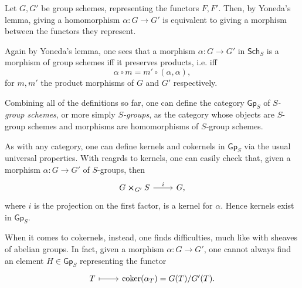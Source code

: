 \documentclass[../Main]{subfiles}
\begin{document}
\begin{rem}
	Let $G, G'$ be group schemes, representing the functors $F,F'$.
	Then, by Yoneda's lemma, giving a homomorphism $\alpha\colon G \to G'$
	is equivalent to giving a morphism between the functors they represent.

	Again by Yoneda's lemma, one sees that a morphism $\alpha\colon G \to G'$
	in $\mathsf{Sch}_{ S }$ is a morphism of group schemes iff
	it preserves products, i.e. iff
	\begin{equation}
		\alpha \circ m = m' \circ (\alpha, \alpha)
	,\end{equation} 
	for $m, m'$ the product morphisms of $G$ and $G'$ respectively.
\end{rem}

\begin{defn}
	Combining all of the definitions so far, one can define the category $\mathsf{Gp}_S$
	of {\em $S$-group schemes}, or more simply {\em $S$-groups},
	as the category whose objects are $S$-group schemes
	and morphisms are homomorphisms of $S$-group schemes.
\end{defn}

\begin{rem}
	As with any category, one can define kernels and cokernels 
	in $\mathsf{Gp}_S$ via the usual universal properties.
	With reagrds to kernels, one can easily check that, given a morphism
	$\alpha\colon G \to G'$ of $S$-groups, then 
	\begin{equation}
	\begin{tikzcd}
		G \cross_{ G' } S \arrow[r, "i", rightarrow] &
		G,
	\end{tikzcd}
	\end{equation} 
	where $i$ is the projection on the first factor, is a kernel for $\alpha$.
	Hence kernels exist in $\mathsf{Gp}_S$.
	
	When it comes to cokernels, instead, one finds difficulties, much like
	with sheaves of abelian groups.
	In fact, given a morphism $\alpha\colon G \to G'$, one cannot always find an
	element $H \in \mathsf{Gp}_S$ representing the functor
	\begin{equation}
	\begin{tikzcd}
		T \arrow[r, "", mapsto] &
		\coker (\alpha_T) =
		G(T)/G'(T).
	\end{tikzcd}
	\end{equation}
\end{rem}
\end{document}
